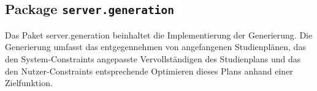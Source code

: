 \FloatBarrier
\subsection[Package server.generation]{Package \texttt{server.generation}}
Das Paket server.generation beinhaltet die Implementierung der Generierung. 
Die Generierung umfasst das entgegennehmen von angefangenen Studienplänen, das den System-Constraints angepasste Vervollständigen des Studienplans 
und das den Nutzer-Constraints entsprechende Optimieren dieses Plans anhand einer Zielfunktion.